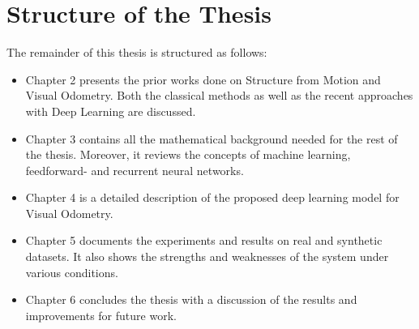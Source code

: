 	\section{Structure of the Thesis}
		The remainder of this thesis is structured as follows:
		\begin{itemize}
			\item Chapter 2 presents the prior works done on Structure from Motion and Visual Odometry. 
			Both the classical methods as well as the recent approaches with Deep Learning are discussed.
			
			\item Chapter 3 contains all the mathematical background needed for the rest of the thesis.
			Moreover, it reviews the concepts of machine learning, feedforward- and recurrent neural networks.
			
			\item Chapter 4 is a detailed description of the proposed deep learning model for Visual Odometry.
			
			\item Chapter 5 documents the experiments and results on real and synthetic datasets.
			It also shows the strengths and weaknesses of the system under various conditions.
			
			\item Chapter 6 concludes the thesis with a discussion of the results and improvements for future work.
		\end{itemize}
	